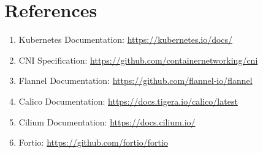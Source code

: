 \documentclass[12pt,a4paper]{article}
\begin{document}
\section{References}
\begin{enumerate}[leftmargin=1.8em]
    \item Kubernetes Documentation: \url{https://kubernetes.io/docs/}
    \item CNI Specification: \url{https://github.com/containernetworking/cni}
    \item Flannel Documentation: \url{https://github.com/flannel-io/flannel}
    \item Calico Documentation: \url{https://docs.tigera.io/calico/latest}
    \item Cilium Documentation: \url{https://docs.cilium.io/}
    \item Fortio: \url{https://github.com/fortio/fortio}
\end{enumerate}
\end{document}
